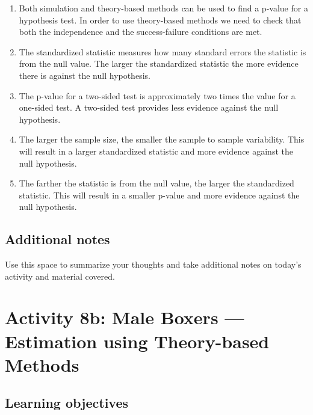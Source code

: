 \documentclass[
]{report}
\begin{document}
\begin{enumerate}
\def\labelenumi{\arabic{enumi}.}
\item
  Both simulation and theory-based methods can be used to find a p-value for a hypothesis test. In order to use theory-based methods we need to check that both the independence and the success-failure conditions are met.
\item
  The standardized statistic measures how many standard errors the statistic is from the null value. The larger the standardized statistic the more evidence there is against the null hypothesis.
\item
  The p-value for a two-sided test is approximately two times the value for a one-sided test. A two-sided test provides less evidence against the null hypothesis.
\item
  The larger the sample size, the smaller the sample to sample variability. This will result in a larger standardized statistic and more evidence against the null hypothesis.
\item
  The farther the statistic is from the null value, the larger the standardized statistic. This will result in a smaller p-value and more evidence against the null hypothesis.
\end{enumerate}

\hypertarget{additional-notes-9}{%
\subsection{Additional notes}\label{additional-notes-9}}

Use this space to summarize your thoughts and take additional notes on today's activity and material covered.

\newpage

\hypertarget{activity-8b-male-boxers-estimation-using-theory-based-methods}{%
\section{Activity 8b: Male Boxers --- Estimation using Theory-based Methods}\label{activity-8b-male-boxers-estimation-using-theory-based-methods}}


\hypertarget{learning-objectives-10}{%
\subsection{Learning objectives}\label{learning-objectives-10}}
\end{document}
